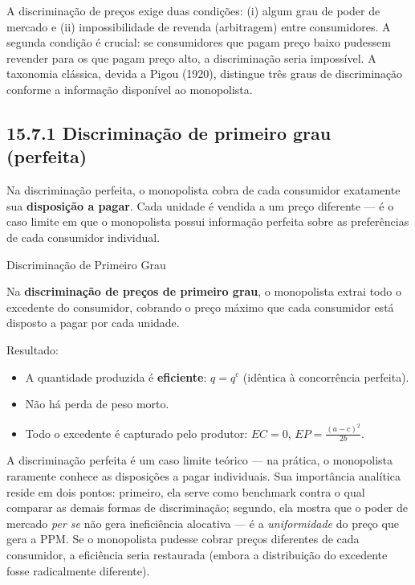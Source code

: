 \documentclass[11pt,twoside,openright]{book}
\providecommand{\tightlist}{\setlength{\itemsep}{0pt}\setlength{\parskip}{0pt}}
\begin{document}
A discriminação de preços exige duas condições: (i) algum grau de poder
de mercado e (ii) impossibilidade de revenda (arbitragem) entre
consumidores. A segunda condição é crucial: se consumidores que pagam
preço baixo pudessem revender para os que pagam preço alto, a
discriminação seria impossível. A taxonomia clássica, devida a Pigou
(1920), distingue três graus de discriminação conforme a informação
disponível ao monopolista.

\subsection{15.7.1 Discriminação de primeiro grau
(perfeita)}\label{discriminauxe7uxe3o-de-primeiro-grau-perfeita}

Na discriminação perfeita, o monopolista cobra de cada consumidor
exatamente sua \textbf{disposição a pagar}. Cada unidade é vendida a um
preço diferente --- é o caso limite em que o monopolista possui
informação perfeita sobre as preferências de cada consumidor individual.

\begin{definitionbox}{Discriminação de Primeiro Grau}

Na \textbf{discriminação de preços de primeiro grau}, o monopolista
extrai todo o excedente do consumidor, cobrando o preço máximo que cada
consumidor está disposto a pagar por cada unidade.

\end{definitionbox}

Resultado:

\begin{itemize}
\tightlist
\item
  A quantidade produzida é \textbf{eficiente}: \(q = q^c\) (idêntica à
  concorrência perfeita).
\item
  Não há perda de peso morto.
\item
  Todo o excedente é capturado pelo produtor: \(EC = 0\),
  \(EP = \frac{(a-c)^2}{2b}\).
\end{itemize}

A discriminação perfeita é um caso limite teórico --- na prática, o
monopolista raramente conhece as disposições a pagar individuais. Sua
importância analítica reside em dois pontos: primeiro, ela serve como
benchmark contra o qual comparar as demais formas de discriminação;
segundo, ela mostra que o poder de mercado \emph{per se} não gera
ineficiência alocativa --- é a \emph{uniformidade} do preço que gera a
PPM. Se o monopolista pudesse cobrar preços diferentes de cada
consumidor, a eficiência seria restaurada (embora a distribuição do
excedente fosse radicalmente diferente).
\end{document}
